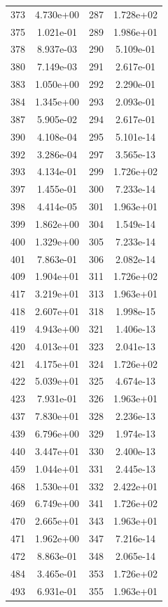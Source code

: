 \documentclass[12pt]{article}
\begin{document}
\begin{longtable}{@{}cccc@{}}
373 & 4.730e+00 & 287 & 1.728e+02 \\
375 & 1.021e-01 & 289 & 1.986e+01 \\
378 & 8.937e-03 & 290 & 5.109e-01 \\
380 & 7.149e-03 & 291 & 2.617e-01 \\
383 & 1.050e+00 & 292 & 2.290e-01 \\
384 & 1.345e+00 & 293 & 2.093e-01 \\
387 & 5.905e-02 & 294 & 2.617e-01 \\
390 & 4.108e-04 & 295 & 5.101e-14 \\
392 & 3.286e-04 & 297 & 3.565e-13 \\
393 & 4.134e-01 & 299 & 1.726e+02 \\
397 & 1.455e-01 & 300 & 7.233e-14 \\
398 & 4.414e-05 & 301 & 1.963e+01 \\
399 & 1.862e+00 & 304 & 1.549e-14 \\
400 & 1.329e+00 & 305 & 7.233e-14 \\
401 & 7.863e-01 & 306 & 2.082e-14 \\
409 & 1.904e+01 & 311 & 1.726e+02 \\
417 & 3.219e+01 & 313 & 1.963e+01 \\
418 & 2.607e+01 & 318 & 1.998e-15 \\
419 & 4.943e+00 & 321 & 1.406e-13 \\
420 & 4.013e+01 & 323 & 2.041e-13 \\
421 & 4.175e+01 & 324 & 1.726e+02 \\
422 & 5.039e+01 & 325 & 4.674e-13 \\
423 & 7.931e-01 & 326 & 1.963e+01 \\
437 & 7.830e+01 & 328 & 2.236e-13 \\
439 & 6.796e+00 & 329 & 1.974e-13 \\
440 & 3.447e+01 & 330 & 2.400e-13 \\
459 & 1.044e+01 & 331 & 2.445e-13 \\
468 & 1.530e+01 & 332 & 2.422e+01 \\
469 & 6.749e+00 & 341 & 1.726e+02 \\
470 & 2.665e+01 & 343 & 1.963e+01 \\
471 & 1.962e+00 & 347 & 7.216e-14 \\
472 & 8.863e-01 & 348 & 2.065e-14 \\
484 & 3.465e-01 & 353 & 1.726e+02 \\
493 & 6.931e-01 & 355 & 1.963e+01 \\

\end{longtable}
\end{document}
